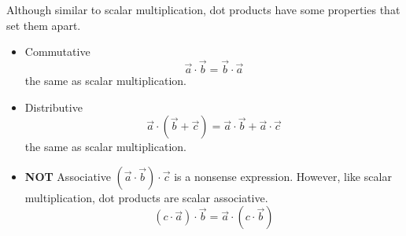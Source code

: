 \noindent
Although similar to scalar multiplication, dot products have some properties that set them apart.
\begin{itemize}
	\item Commutative
		\begin{equation*}
			\vec{a}\cdot\vec{b} = \vec{b}\cdot\vec{a}	
		\end{equation*}
		the same as scalar multiplication.
	\item Distributive
		\begin{equation*}
			\vec{a}\cdot\left(\vec{b}+\vec{c}\right) = \vec{a}\cdot\vec{b}+\vec{a}\cdot\vec{c}
		\end{equation*}
		the same as scalar multiplication.
	\item \textbf{NOT} Associative $\left(\vec{a}\cdot\vec{b}\right)\cdot\vec{c}$ is a nonsense expression. However, like scalar multiplication, dot products are scalar associative.
	\begin{equation*}
		\left(c\cdot\vec{a}\right)\cdot\vec{b} = \vec{a}\cdot\left(c\cdot\vec{b}\right)
	\end{equation*}
\end{itemize}